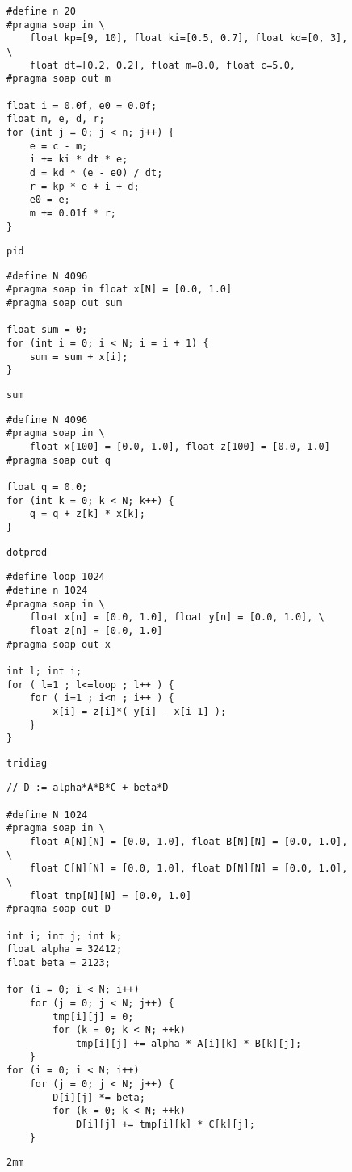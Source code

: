 \begin{figure}[ht]
\begin{lstlisting}
#define n 20
#pragma soap in \
    float kp=[9, 10], float ki=[0.5, 0.7], float kd=[0, 3], \
    float dt=[0.2, 0.2], float m=8.0, float c=5.0,
#pragma soap out m

float i = 0.0f, e0 = 0.0f;
float m, e, d, r;
for (int j = 0; j < n; j++) {
    e = c - m;
    i += ki * dt * e;
    d = kd * (e - e0) / dt;
    r = kp * e + i + d;
    e0 = e;
    m += 0.01f * r;
}
\end{lstlisting}
\caption{\texttt{pid}}
\end{figure}


\begin{figure}[ht]
\begin{lstlisting}
#define N 4096
#pragma soap in float x[N] = [0.0, 1.0]
#pragma soap out sum

float sum = 0;
for (int i = 0; i < N; i = i + 1) {
    sum = sum + x[i];
}
\end{lstlisting}
\caption{\texttt{sum}}
\end{figure}


\begin{figure}[ht]
\begin{lstlisting}
#define N 4096
#pragma soap in \
    float x[100] = [0.0, 1.0], float z[100] = [0.0, 1.0]
#pragma soap out q

float q = 0.0;
for (int k = 0; k < N; k++) {
    q = q + z[k] * x[k];
}
\end{lstlisting}
\caption{\texttt{dotprod}}
\end{figure}


\begin{figure}[ht]
\begin{lstlisting}
#define loop 1024
#define n 1024
#pragma soap in \
    float x[n] = [0.0, 1.0], float y[n] = [0.0, 1.0], \
    float z[n] = [0.0, 1.0]
#pragma soap out x

int l; int i;
for ( l=1 ; l<=loop ; l++ ) {
    for ( i=1 ; i<n ; i++ ) {
        x[i] = z[i]*( y[i] - x[i-1] );
    }
}
\end{lstlisting}
\caption{\texttt{tridiag}}
\end{figure}


\begin{figure}[ht]
\begin{lstlisting}
// D := alpha*A*B*C + beta*D

#define N 1024
#pragma soap in \
    float A[N][N] = [0.0, 1.0], float B[N][N] = [0.0, 1.0], \
    float C[N][N] = [0.0, 1.0], float D[N][N] = [0.0, 1.0], \
    float tmp[N][N] = [0.0, 1.0]
#pragma soap out D

int i; int j; int k;
float alpha = 32412;
float beta = 2123;

for (i = 0; i < N; i++)
    for (j = 0; j < N; j++) {
        tmp[i][j] = 0;
        for (k = 0; k < N; ++k)
            tmp[i][j] += alpha * A[i][k] * B[k][j];
    }
for (i = 0; i < N; i++)
    for (j = 0; j < N; j++) {
        D[i][j] *= beta;
        for (k = 0; k < N; ++k)
            D[i][j] += tmp[i][k] * C[k][j];
    }
\end{lstlisting}
\caption{\texttt{2mm}}
\end{figure}


